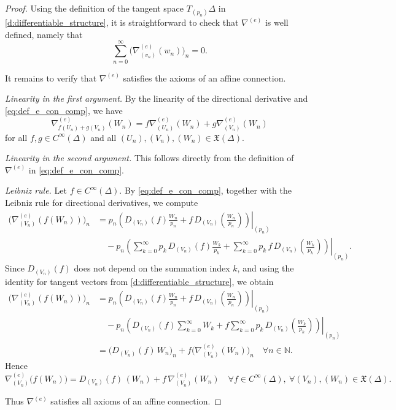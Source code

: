 \documentclass[12pt]{amsart}
\numberwithin{figure}{section}
\numberwithin{table}{section}
\numberwithin{equation}{section}
\def\NN{\mathbb{N}}
\newcommand\restr[2]{\ensuremath{\left.#1\right|_{#2}}}
\begin{document}
\begin{proof}
Using the definition of the tangent space \(T_{(p_n)}\Delta\) in \eqref{d:differentiable_structure}, it is straightforward to check that \(\nabla^{(e)}\) is well defined, namely that
\[
\sum_{n=0}^{\infty}\bigl(\nabla^{(e)}_{(v_n)}(w_n)\bigr)_n = 0.
\]

It remains to verify that \(\nabla^{(e)}\) satisfies the axioms of an affine connection.

\textit{Linearity in the first argument.}
By the linearity of the directional derivative and \eqref{eq:def_e_con_comp}, we have
\[
\nabla^{(e)}_{f(U_n)+g(V_n)}(W_n)
=
f\nabla^{(e)}_{(U_n)}(W_n)
+
g\nabla^{(e)}_{(V_n)}(W_n)
\]
for all \(f,g\in C^{\infty}(\Delta)\) and all \((U_n),(V_n),(W_n)\in \mathfrak{X}(\Delta)\).

\textit{Linearity in the second argument.}
This follows directly from the definition of \(\nabla^{(e)}\) in \eqref{eq:def_e_con_comp}.

\textit{Leibniz rule.}
Let \(f\in C^\infty(\Delta)\). By \eqref{eq:def_e_con_comp}, together with the Leibniz rule for directional derivatives, we compute
\begin{align*}
\bigl(\nabla^{(e)}_{(V_n)}(f(W_n))\bigr)_n
&=
p_n\restr{\left(
D_{(V_n)}(f)\frac{W_n}{p_n}
+
f\,D_{(V_n)}\!\left(\frac{W_n}{p_n}\right)\right)}{(p_n)}\\
&\quad
- p_n \restr{\left(
\sum_{k=0}^{\infty}p_k\,D_{(V_n)}(f)\frac{W_k}{p_k}
+
\sum_{k=0}^{\infty}p_k\,f\,D_{(V_n)}\!\left(\frac{W_k}{p_k}\right)
\right)}{(p_n)}.
\end{align*}
Since \(D_{(V_n)}(f)\) does not depend on the summation index \(k\), and using the identity for tangent vectors from \eqref{d:differentiable_structure}, we obtain
\begin{align*}
\bigl(\nabla^{(e)}_{(V_n)}(f(W_n))\bigr)_n
&=
p_n\restr{\left(
D_{(V_n)}(f)\frac{W_n}{p_n}
+
f\,D_{(V_n)}\!\left(\frac{W_n}{p_n}\right)\right)}{(p_n)}\\
&\quad
- p_n\restr{\left(
D_{(V_n)}(f)\sum_{k=0}^{\infty}W_k
+
f\sum_{k=0}^{\infty}p_k\,D_{(V_n)}\!\left(\frac{W_k}{p_k}\right)
\right)}{(p_n)} \\
&=
\bigl(D_{(V_n)}(f)\,W_n\bigr)_n
+
f\bigl(\nabla^{(e)}_{(V_n)}(W_n)\bigr)_n \quad \forall n\in \NN.
\end{align*}
Hence
\[
\nabla^{(e)}_{(V_n)}\bigl(f(W_n)\bigr)
=
D_{(V_n)}(f)\,(W_n)
+
f\,\nabla^{(e)}_{(V_n)}(W_n)
\quad \forall f\in C^{\infty}(\Delta),\ \forall (V_n),(W_n)\in \mathfrak{X}(\Delta).
\]

Thus \(\nabla^{(e)}\) satisfies all axioms of an affine connection.
\end{proof}
\end{document}
